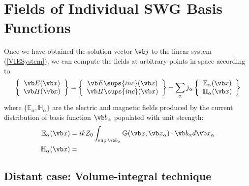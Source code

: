 \documentclass[letterpaper]{article}
\begin{document}
\newpage
\section{Fields of Individual SWG Basis Functions}

Once we have obtained the solution vector $\vb j$ to the 
linear system (\ref{VIESystem}), we can compute the fields
at arbitrary points in space according to 
$$ \left\{ \begin{array}{c} \vb E(\vb x) \\ 
                            \vb H(\vb x) 
           \end{array} 
   \right\}
   = 
   \left\{ \begin{array}{c} \vb E\sups{inc}(\vb x) \\ 
                            \vb H\sups{inc}(\vb x) 
           \end{array} 
   \right\}
  + 
  \sum_\alpha j_\alpha
   \left\{ \begin{array}{c} \mathbb{E}_\alpha(\vb x) \\ 
                            \mathbb{H}_\alpha(\vb x)
           \end{array} 
   \right\}
$$
where $\{\mathbb{E}_\alpha, \mathbb{H}_\alpha\}$ are the
electric and magnetic fields produced by the current distribution
of basis function $\vb b_\alpha$ populated with unit strength:
\begin{subequations}
\begin{align}
 \mathbb{E}_\alpha(\vb x)
&= ikZ_0 
   \int_{\sup \vb b_\alpha} \mathbb{G}(\vb x, \vb x_\alpha) \cdot \vb b_\alpha
   d\vb x_\alpha
\\
 \mathbb{H}_\alpha(\vb x)
&= 
\end{align}
\label{EHAlpha}
\end{subequations}

\subsection*{Distant case: Volume-integral technique}
\end{document}
